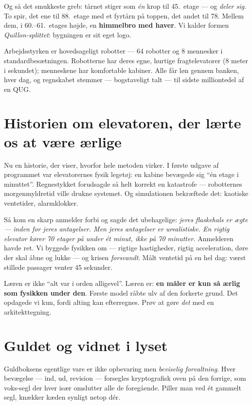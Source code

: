 \documentclass[11pt,a4paper]{article}
\begin{document}
Og så det smukkeste greb: tårnet stiger som \emph{én} krop til 45.\ etage ---
og \emph{deler sig}. To spir, det ene til 88.\ etage med et fyrtårn på toppen,
det andet til 78. Mellem dem, i 60.--61.\ etages højde, en \textbf{himmelbro
med haver}. Vi kalder formen \emph{Quillon-splittet}: bygningen er sit eget
logo.

Arbejdsstyrken er hovedsageligt robotter --- 64 robotter og 8 mennesker i
standardbesætningen. Robotterne har deres egne, hurtige fragtelevatorer
(8 meter i sekundet); menneskene har komfortable kabiner. Alle får løn gennem
banken, hver dag, og regnskabet stemmer --- bogstaveligt talt --- til sidste
milliontedel af en QUG.

\section*{Historien om elevatoren, der lærte os at være ærlige}

Nu en historie, der viser, hvorfor hele metoden virker. I første udgave af
programmet var elevatorernes fysik legetøj: en kabine bevægede sig ``én etage
i minuttet''. Regnestykket forudsagde så helt korrekt en katastrofe ---
robotternes morgenmyldretid ville drukne systemet. Og simulationen bekræftede
det: kaotiske ventetider, alarmklokker.

Så kom en skarp anmelder forbi og sagde det ubehagelige: \emph{jeres flaskehals
er ægte --- inden for jeres antagelser. Men jeres antagelser er urealistiske.
En rigtig elevator kører 70 etager på under ét minut, ikke på 70 minutter.}
Anmelderen havde ret. Vi byggede fysikken om --- rigtige hastigheder, rigtig
acceleration, døre der skal åbne og lukke --- og krisen \emph{forsvandt}.
Målt ventetid på en hel dag: værst stillede passager venter 45 sekunder.

Læren er ikke ``alt var i orden alligevel''. Læren er: \textbf{en måler er kun
så ærlig som fysikken under den}. Første model råbte ulv af den forkerte
grund. Det opdagede vi kun, fordi alting kan efterregnes. Prøv at gøre
\emph{det} med en arkitekttegning.

\section*{Guldet og vidnet i lyset}

Guldboksens egentlige vare er ikke opbevaring men \emph{beviselig
forvaltning}. Hver bevægelse --- ind, ud, revision --- forsegles kryptografisk
oven på den forrige, som voks-segl der hver især omslutter alle de foregående.
Piller man ved ét gammelt segl, knækker kæden synligt netop dér.
\end{document}
